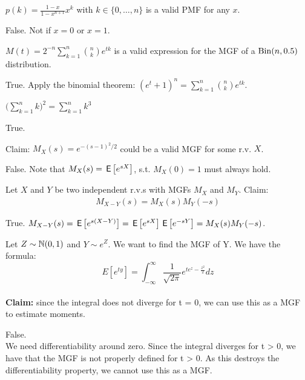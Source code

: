\documentclass[tf-tutorial-all.tex]{subfiles}
\begin{document}
\begin{truefalse}
$p(k) = \frac{1-x}{1-x^{n+1}} x^k$ with $k \in \{0, \dots, n\}$ is a valid PMF for any $x$.
\begin{solution}
  False. Not if $x = 0$ or $x = 1$.
\end{solution}
\end{truefalse}

\begin{truefalse}
  $M(t) = 2^{-n} \sum_{k=1}^n \binom{n}{k} e^{tk}$ is a valid expression for the MGF of a $\mathrm{Bin}(n, 0.5)$ distribution.
\begin{solution}
True. Apply the binomial theorem: $(e^t + 1)^n = \sum_{k=1}^n \binom{n}{k} e^{tk}$.
\end{solution}
\end{truefalse}

\begin{truefalse}
$\big(\sum_{k=1}^n k \big)^2 = \sum_{k=1}^n k^3$
\begin{solution}
True.
\end{solution}
\end{truefalse}




\begin{truefalse}
Claim: $M_X(s)=e^{-(s-1)^2/2}$ could be a valid MGF for some r.v. $X$.
\begin{solution}
False. Note that $M_X(s)=\,\mathsf{E}\left[e^{sX}\right]$, s.t. $M_X(0)=1$ must always hold.
\end{solution}
\end{truefalse}





\begin{truefalse}
Let $X$ and $Y$ be two independent r.v.s with MGFs $M_X$ and $M_Y$. Claim:
\begin{align}
\label{eq:2}
M_{X-Y}(s)=M_X(s)M_Y(-s)
\end{align}
\begin{solution}
True. $M_{X-Y}(s)=\,\mathsf{E}\left[e^{s(X-Y)}\right]=\,\mathsf{E}\left[e^{sX}\right]\,\mathsf{E}\left[e^{-sY}\right]=M_X(s)M_Y(-s)$.
\end{solution}
\end{truefalse}

\begin{truefalse}
Let $Z \sim \mathbb{N}(0,1)$ and $Y \sim e^{Z}$. We want to find the MGF of Y.
We have the formula:
$$E[e^{ty}] = \int^{\infty}_{-\infty} \frac{1}{\sqrt{2 \pi}} e^{t e^{z} - \frac{z^{2}}{2}} dz$$
\\ \textbf{Claim: } since the integral does not diverge for t = 0, we can use this as a MGF to estimate moments. 
\begin{solution}
    False.
    \\We need differentiability around zero. Since the integral diverges for t > 0, we have that the MGF is not properly defined for t > 0. As this destroys the differentiability property, we cannot use this as a MGF. 
\end{solution}
\end{truefalse}
\end{document}
